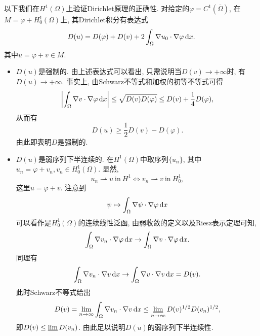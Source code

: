 \documentclass[12pt,a4paper]{article}
\begin{document}
以下我们在$H^1(\Omega)$上验证Dirichlet原理的正确性.
对给定的$\varphi = C^1(\overline{\Omega})$, 在$M = \varphi + H_0^1(\Omega)$上, 其Dirichlet积分有表达式 
\begin{equation*}
    D(u) = D(\varphi) + D(v) + 2\int_{\Omega}\nabla u_0 \cdot \nabla \varphi \,{\rm d}x.
\end{equation*}
其中$u = \varphi + v \in M$.
\begin{itemize}
    \item $D(u)$是强制的. 由上述表达式可以看出, 只需说明当$D(v) \rightarrow +\infty$时, 有$D(u) \rightarrow +\infty$.
    事实上, 由Schwarz不等式和加权的初等不等式可得 
    \begin{equation*}
        \left|\int_{\Omega}\nabla v \cdot \nabla \varphi \,{\rm d}x\right| \leq \sqrt{D(v)D(\varphi)} \leq D(v) + \frac{1}{4}D(\varphi),
    \end{equation*}
    从而有 
    \begin{equation*}
        D(u) \geq \frac{1}{2}D(v) - D(\varphi).
    \end{equation*}
    由此即表明$D$是强制的.
    \item $D(u)$是弱序列下半连续的. 在$H^1(\Omega)$中取序列$\{u_n\}$, 其中$u_n = \varphi + v_n, v_n \in H_0^1(\Omega)$. 
    显然, 
    \begin{equation*}
        u_n \rightharpoonup u \ \text{in}\ H^1 \Leftrightarrow v_n \rightharpoonup v \ \text{in}\ H_0^1,
    \end{equation*}
    这里$u = \varphi + v$. 注意到
    \begin{equation*}
        \psi \mapsto \int_{\Omega}\nabla \psi \cdot \nabla \varphi \,{\rm d}x
    \end{equation*}
    可以看作是$H_0^1(\Omega)$的连续线性泛函, 由弱收敛的定义以及Riesz表示定理可知, 
    \begin{equation*}
        \int_{\Omega}\nabla v_n \cdot \nabla \varphi \,{\rm d}x \rightarrow \int_{\Omega}\nabla v \cdot \nabla \varphi \,{\rm d}x.
    \end{equation*}
    同理有 
    \begin{equation*}
        \int_{\Omega}\nabla v_n \cdot \nabla v \,{\rm d}x \rightarrow \int_{\Omega}\nabla v \cdot \nabla v \,{\rm d}x = D(v).
    \end{equation*}
    此时Schwarz不等式给出 
    \begin{equation*}
        D(v) = \lim\limits_{n \rightarrow \infty}\int_{\Omega}\nabla v_n \cdot \nabla v \,{\rm d}x \leq \varliminf\limits_{n \rightarrow \infty}D(v)^{1/2}D(v_n)^{1/2}, 
    \end{equation*}
    即$D(v) \leq \varliminf D(v_n)$. 由此足以说明$D(u)$的弱序列下半连续性.
\end{itemize}
\end{document}
